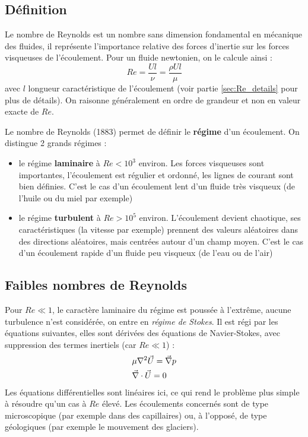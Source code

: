 
\subsection{Définition}
Le nombre de Reynolds est un nombre sans dimension fondamental en mécanique des fluides, il représente l'importance relative des forces d'inertie sur les forces visqueuses de l'écoulement. Pour un fluide newtonien, on le calcule ainsi :
%
\begin{equation}
Re = \frac{Ul}{\nu} = \frac{\rho U l}{\mu}
\end{equation}
%
avec $l$ longueur caractéristique de l'écoulement (voir partie \ref{sec:Re_details} pour plus de détails). On raisonne généralement en ordre de grandeur et non en valeur exacte de $Re$.

Le nombre de Reynolds (1883) permet de définir le \textbf{régime} d'un écoulement. On distingue 2 grands régimes :
%
\begin{itemize}
\item le régime \textbf{laminaire} à $Re<10^3$ environ. Les forces visqueuses sont importantes, l'écoulement est régulier et ordonné, les lignes de courant sont bien définies. C'est le cas d'un écoulement lent d'un fluide très visqueux (de l'huile ou du miel par exemple)

\item le régime \textbf{turbulent} à $Re>10^5$ environ. L'écoulement devient chaotique, ses caractéristiques (la vitesse par exemple) prennent des valeurs aléatoires dans des directions aléatoires, mais centrées autour d'un champ moyen. C'est le cas d'un écoulement rapide d'un fluide peu visqueux (de l'eau ou de l'air)
\end{itemize}


\subsection{Faibles nombres de Reynolds}
Pour $Re \ll 1$, le caractère laminaire du régime est poussée à l'extrême, aucune turbulence n'est considérée, on entre en \textit{régime de Stokes}. Il est régi par les équations suivantes, elles sont dérivées des équations de Navier-Stokes, avec suppression des termes inertiels (car $Re \ll 1$) :
%
\begin{align}[left=\empheqlbrace]
 & \mu \nabla^2 \vec{U} = \vec{\nabla} p\\
 \notag & \vec{\nabla} \cdot \vec{U} = 0
\end{align}
%
Les équations différentielles sont linéaires ici, ce qui rend le problème plus simple à résoudre qu'un cas à $Re$ élevé. Les écoulements concernés sont de type microscopique (par exemple dans des capillaires) ou, à l'opposé, de type géologiques (par exemple le mouvement des glaciers).


